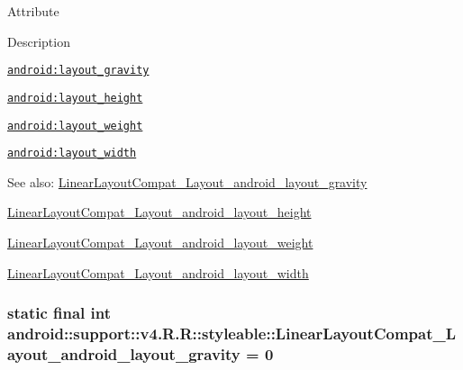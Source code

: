 Attribute

Description 

{\tt \hyperlink{classandroid_1_1support_1_1v4_1_1_r_1_1styleable_5ffdb7df8cf149a63ae42570644268fc}{android:layout\_\-gravity}}

{\tt \hyperlink{classandroid_1_1support_1_1v4_1_1_r_1_1styleable_eafec718baa0f8681ec6643c6cd2e749}{android:layout\_\-height}}

{\tt \hyperlink{classandroid_1_1support_1_1v4_1_1_r_1_1styleable_b4af83ad77725822d082552796d2bfae}{android:layout\_\-weight}}

{\tt \hyperlink{classandroid_1_1support_1_1v4_1_1_r_1_1styleable_133e851e27e11681c8f244c2550bc0a7}{android:layout\_\-width}}

\begin{Desc}
\item[See also:]\hyperlink{classandroid_1_1support_1_1v4_1_1_r_1_1styleable_5ffdb7df8cf149a63ae42570644268fc}{LinearLayoutCompat\_\-Layout\_\-android\_\-layout\_\-gravity} 

\hyperlink{classandroid_1_1support_1_1v4_1_1_r_1_1styleable_eafec718baa0f8681ec6643c6cd2e749}{LinearLayoutCompat\_\-Layout\_\-android\_\-layout\_\-height} 

\hyperlink{classandroid_1_1support_1_1v4_1_1_r_1_1styleable_b4af83ad77725822d082552796d2bfae}{LinearLayoutCompat\_\-Layout\_\-android\_\-layout\_\-weight} 

\hyperlink{classandroid_1_1support_1_1v4_1_1_r_1_1styleable_133e851e27e11681c8f244c2550bc0a7}{LinearLayoutCompat\_\-Layout\_\-android\_\-layout\_\-width} \end{Desc}
\hypertarget{classandroid_1_1support_1_1v4_1_1_r_1_1styleable_5ffdb7df8cf149a63ae42570644268fc}{
\subsubsection[{LinearLayoutCompat\_\-Layout\_\-android\_\-layout\_\-gravity}]{\setlength{\rightskip}{0pt plus 5cm}static final int android::support::v4.R.R::styleable::LinearLayoutCompat\_\-Layout\_\-android\_\-layout\_\-gravity = 0}}
\label{classandroid_1_1support_1_1v4_1_1_r_1_1styleable_5ffdb7df8cf149a63ae42570644268fc}


